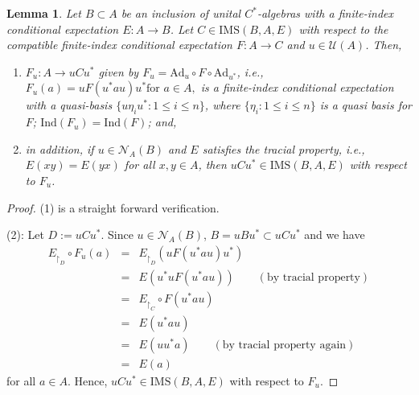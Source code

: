\documentclass[a4]{amsart}
\newtheorem{lemma}[theorem]{\bf Lemma}
\numberwithin{equation}{section}
\begin{document}
\begin{lemma} \label{conj_F}
 Let $B \subset A$ be an inclusion of unital $C^*$-algebras with a
 finite-index conditional expectation $E : A \to B$. Let $C \in
 \mathrm{IMS}(B,A,E)$ with respect to the compatible finite-index
 conditional expectation $F :A \to C$ and $u\in \mathcal{U}(A)$. Then,
 \begin{enumerate}
 \item $F_u : A \to uCu^*$ given by $F_u= \mathrm{Ad}_{u} \circ F
   \circ \mathrm{Ad}_{u^*}$, i.e., \( F_u(a) = u F(u^*au)u^* \text{
     for } a \in A, \) is a finite-index conditional expectation with
   a quasi-basis $\{ u \eta_i u^* : 1 \leq i \leq n\}$, where $\{
   \eta_i : 1 \leq i \leq n\}$ is a quasi basis for $F$;
   $\mathrm{Ind}(F_u) = \mathrm{Ind}(F)$; and,
   \item in addition, if $u \in \mathcal{N}_A(B)$ and $E$ satisfies the tracial
     property, i.e., $E(xy) = E(yx)$ for all $x,y \in A$, then
      $uCu^*
     \in \mathrm{IMS}(B,A,E)$ with respect to $F_u$.
        \end{enumerate}
 \end{lemma}
\begin{proof}
(1) is a straight forward verification.\smallskip

  (2): Let $D:=u Cu^*$. Since $u \in \mathcal{N}_A(B)$, $B = uBu^*
  \subset u Cu^*$ and we have
 \begin{eqnarray*}
 	E_{\restriction_D}\circ F_u(a) & = & E_{\restriction_D}(u F(u^*au)u^*)\\
 	& = & E( u^* uF(u^*au)) \qquad (\text{by tracial property})\\
 	 	& = & E_{\restriction_C}\circ F(u^*au)\\
 	& = & E(u^*au)    \\
 	& = & E(uu^*a)  \qquad (\text{by tracial property again})\\
 	& = & E(a)
 \end{eqnarray*}
 for all $a \in A$. Hence, $uCu^* \in \mathrm{IMS}(B,A,E)$ with respect to $F_u$. 
\end{proof}
\end{document}
